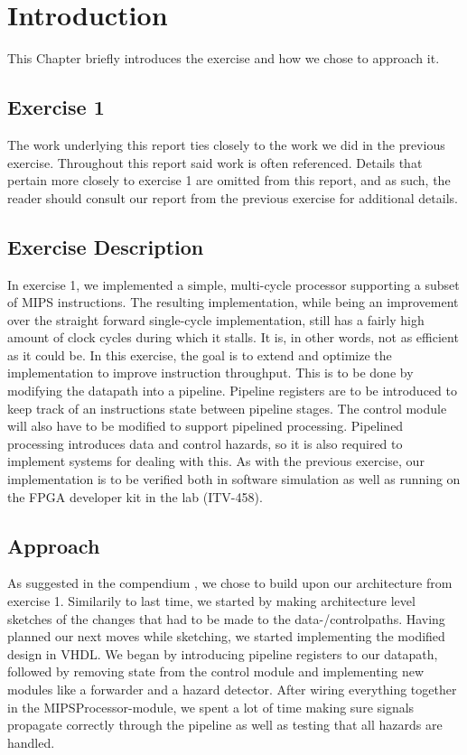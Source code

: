 \chapter{Introduction}
This Chapter briefly introduces the exercise and how we chose to approach it.

\section{Exercise 1}

The work underlying this report ties closely to the work we did in the previous exercise.
Throughout this report said work is often referenced.
Details that pertain more closely to exercise 1 are omitted from this report, and as such, the reader should consult our report from the previous exercise \cite{ex1report} for additional details.

\section{Exercise Description}

In exercise 1, we implemented a simple, multi-cycle processor supporting a subset of MIPS instructions.
The resulting implementation, while being an improvement over the straight forward single-cycle implementation, still has a fairly high amount of clock cycles during which it stalls.
It is, in other words, not as efficient as it could be.
In this exercise, the goal is to extend and optimize the implementation to improve instruction throughput.
This is to be done by modifying the datapath into a pipeline.
Pipeline registers are to be introduced to keep track of an instructions state between pipeline stages.
The control module will also have to be modified to support pipelined processing.
Pipelined processing introduces data and control hazards, so it is also required to implement systems for dealing with this.
As with the previous exercise, our implementation is to be verified both in software simulation as well as running on the FPGA developer kit in the lab (ITV-458).


\section{Approach}

As suggested in the compendium \cite{compendium}, we chose to build upon our architecture from exercise 1.
Similarily to last time, we started by making architecture level sketches of the changes that had to be made to the data-/controlpaths.
Having planned our next moves while sketching, we started implementing the modified design in VHDL.
We began by introducing pipeline registers to our datapath, followed by removing state from the control module and implementing new modules like a forwarder and a hazard detector.
After wiring everything together in the MIPSProcessor-module, we spent a lot of time making sure signals propagate correctly through the pipeline as well as testing that all hazards are handled.

